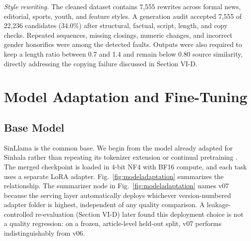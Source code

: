 \documentclass[a4paper,conference]{IEEEtran}
\begin{document}
\textit{Style rewriting.} The cleaned dataset contains 7,555 rewrites across
formal news, editorial, sports, youth, and feature styles. A generation audit
accepted 7,555 of 22,236 candidates (34.0\%) after structural, factual, script,
length, and copy checks. Repeated sequences, missing closings, numeric changes,
and incorrect gender honorifics were among the detected faults. Outputs
were also required to keep a length ratio between 0.7 and 1.4 and remain below 0.80 source
similarity, directly addressing the copying failure discussed in Section VI-D.

\section{Model Adaptation and Fine-Tuning}

\subsection{Base Model}
SinLlama is the common base. We begin from the model already adapted for Sinhala rather than
repeating its tokenizer extension or continual pretraining
\cite{aravinda2025sinllama}. The merged checkpoint is loaded in 4-bit NF4 with
BF16 compute, and each task uses a separate LoRA adapter. Fig.~\ref{fig:modeladaptation}
summarizes the relationship. The summarizer node in Fig.~\ref{fig:modeladaptation}
names v07 because the serving layer automatically deploys whichever
version-numbered adapter folder is highest, independent of any quality
comparison. A leakage-controlled re-evaluation (Section VI-D) later found
this deployment choice is not a quality regression: on a frozen,
article-level held-out split, v07 performs indistinguishably from v06.
\end{document}
